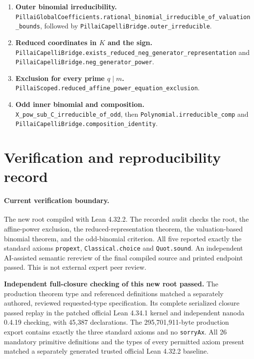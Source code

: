 \documentclass[11pt,letterpaper]{article}
\newcommand{\lean}[1]{{\small\urlstyle{tt}\nolinkurl{#1}}}
\begin{document}
\begingroup\raggedright
\begin{enumerate}[leftmargin=*,itemsep=0.35em]
\item \textbf{Outer binomial irreducibility.}
\lean{PillaiGlobalCoefficients.rational_binomial_irreducible_of_valuation_bounds},
followed by \lean{PillaiCapelliBridge.outer_irreducible}.
\item \textbf{Reduced coordinates in $K$ and the sign.}
\lean{PillaiCapelliBridge.exists_reduced_neg_generator_representation}
and \lean{PillaiCapelliBridge.neg_generator_power}.
\item \textbf{Exclusion for every prime $q\mid m$.}
\lean{PillaiScoped.reduced_affine_power_equation_exclusion}.
\item \textbf{Odd inner binomial and composition.}
\lean{X_pow_sub_C_irreducible_of_odd}, then
\lean{Polynomial.irreducible_comp} and
\lean{PillaiCapelliBridge.composition_identity}.
\end{enumerate}
\endgroup

\section{Verification and reproducibility record}\label{sec:record}
\paragraph{Current verification boundary.}
The new root compiled with Lean 4.32.2. The recorded audit checks the root,
the affine-power exclusion, the reduced-representation theorem, the
valuation-based binomial theorem, and the odd-binomial criterion. All five
reported exactly the standard axioms \lean{propext},
\lean{Classical.choice} and \lean{Quot.sound}.
An independent AI-assisted semantic rereview of the final compiled source
and printed endpoint passed. This is not external expert peer review.

\textbf{Independent full-closure checking of this new root passed.}
The production theorem type and referenced definitions matched a separately
authored, reviewed requested-type specification. Its complete serialized closure
passed replay in the patched official Lean 4.34.1 kernel and independent
nanoda 0.4.19 checking, with 45,387 declarations. The 295,701,911-byte
production export contains exactly the three standard axioms and no
\lean{sorryAx}. All 26 mandatory primitive definitions and the types of
every permitted axiom present matched a separately generated trusted
official Lean 4.32.2 baseline.
\end{document}

